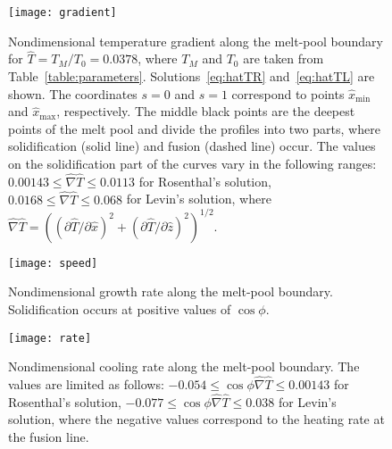 \documentclass{article}
\begin{document}
\begin{figure}
    \centering
    \texttt{[image: gradient]}
    \caption{
        Nondimensional temperature gradient along the melt-pool boundary for $\hat{T}=T_M/T_0=0.0378$,
        where $T_M$ and $T_0$ are taken from Table~\ref{table:parameters}.
        Solutions~\eqref{eq:hatTR} and~\eqref{eq:hatTL} are shown.
        The coordinates $s=0$ and $s=1$ correspond to points $\hat{x}_\text{min}$ and $\hat{x}_\text{max}$, respectively.
        The middle black points are the deepest points of the melt pool and divide the profiles into two parts,
        where solidification (solid line) and fusion (dashed line) occur.
        The values on the solidification part of the curves vary in the following ranges:
        $0.00143 \leq \hat{\nabla}\hat{T} \leq 0.0113$ for Rosenthal's solution,
        $0.0168 \leq \hat{\nabla}\hat{T} \leq 0.068$ for Levin's solution,
        where $\hat{\nabla}\hat{T} = ((\partial\hat{T}/\partial\hat{x})^2 + (\partial\hat{T}/\partial\hat{z})^2)^{1/2}$.
    }\label{fig:gradient}
\end{figure}

\begin{figure}
    \centering
    \texttt{[image: speed]}
    \caption{
        Nondimensional growth rate along the melt-pool boundary.
        Solidification occurs at positive values of $\cos\phi$.
    }\label{fig:speed}
\end{figure}

\begin{figure}
    \centering
    \texttt{[image: rate]}
    \caption{
        Nondimensional cooling rate along the melt-pool boundary.
        The values are limited as follows:
        $-0.054\leq \cos\phi\hat{\nabla}\hat{T} \leq 0.00143$ for Rosenthal's solution,
        $-0.077\leq \cos\phi\hat{\nabla}\hat{T} \leq 0.038$ for Levin's solution,
        where the negative values correspond to the heating rate at the fusion line.
    }\label{fig:rate}
\end{figure}
\end{document}

